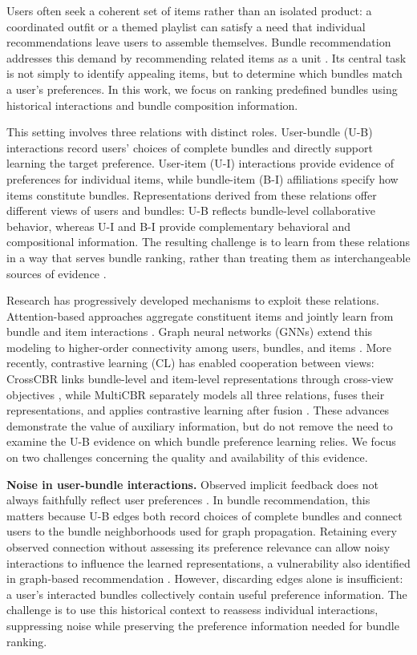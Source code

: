 Users often seek a coherent set of items rather than an isolated product: a coordinated outfit or a themed playlist can satisfy a need that individual recommendations leave users to assemble themselves. Bundle recommendation addresses this demand by recommending related items as a unit \cite{ma2022crosscbr,sun2024intent}. Its central task is not simply to identify appealing items, but to determine which bundles match a user's preferences. In this work, we focus on ranking predefined bundles using historical interactions and bundle composition information.

This setting involves three relations with distinct roles. User-bundle (U-B) interactions record users' choices of complete bundles and directly support learning the target preference. User-item (U-I) interactions provide evidence of preferences for individual items, while bundle-item (B-I) affiliations specify how items constitute bundles. Representations derived from these relations offer different views of users and bundles: U-B reflects bundle-level collaborative behavior, whereas U-I and B-I provide complementary behavioral and compositional information. The resulting challenge is to learn from these relations in a way that serves bundle ranking, rather than treating them as interchangeable sources of evidence \cite{chen2019dam,chang2020bgcn,ma2024multicbr}.

Research has progressively developed mechanisms to exploit these relations. Attention-based approaches aggregate constituent items and jointly learn from bundle and item interactions \cite{chen2019dam}. Graph neural networks (GNNs) extend this modeling to higher-order connectivity among users, bundles, and items \cite{chang2020bgcn}. More recently, contrastive learning (CL) has enabled cooperation between views: CrossCBR links bundle-level and item-level representations through cross-view objectives \cite{ma2022crosscbr}, while MultiCBR separately models all three relations, fuses their representations, and applies contrastive learning after fusion \cite{ma2024multicbr}. These advances demonstrate the value of auxiliary information, but do not remove the need to examine the U-B evidence on which bundle preference learning relies. We focus on two challenges concerning the quality and availability of this evidence.

\textbf{Noise in user-bundle interactions.} Observed implicit feedback does not always faithfully reflect user preferences \cite{wang2021adt}. In bundle recommendation, this matters because U-B edges both record choices of complete bundles and connect users to the bundle neighborhoods used for graph propagation. Retaining every observed connection without assessing its preference relevance can allow noisy interactions to influence the learned representations, a vulnerability also identified in graph-based recommendation \cite{wu2021sgl}. However, discarding edges alone is insufficient: a user's interacted bundles collectively contain useful preference information. The challenge is to use this historical context to reassess individual interactions, suppressing noise while preserving the preference information needed for bundle ranking.

